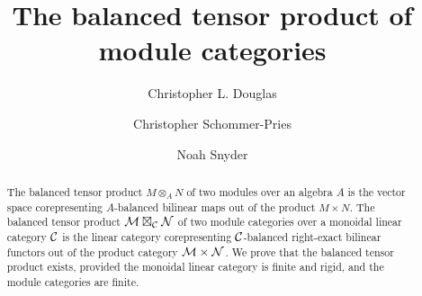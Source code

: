 \documentclass{amsart}
\begin{document}
\title{The balanced tensor product of module categories}

\begin{abstract}
The balanced tensor product $M \otimes_A N$ of two modules over an algebra $A$ is the vector space corepresenting $A$-balanced bilinear maps out of the product $M \times N$.  The balanced tensor product $\mathcal M \boxtimes_{\mathcal C} \mathcal N$ of two module categories over a monoidal linear category $\mathcal C$ is the linear category corepresenting $\mathcal C$-balanced right-exact bilinear functors out of the product category $\mathcal M \times \mathcal N$.  We prove that the balanced tensor product exists, provided the monoidal linear category is finite and rigid, and the module categories are finite.
\end{abstract}





\author{Christopher L. Douglas}
\address{Mathematical Institute\\ University of Oxford\\ Oxford OX1 3LB\\ United Kingdom}
      	
\author{Christopher Schommer-Pries}
\address{Department of Mathematics\\ Max Planck Institute for Mathematics \\ 53111 Bonn \\ Germany}

\author{Noah Snyder}
\address{Department of Mathematics\\ Indiana University\\ Bloomington, IN 47401\\ USA}
\end{document}
